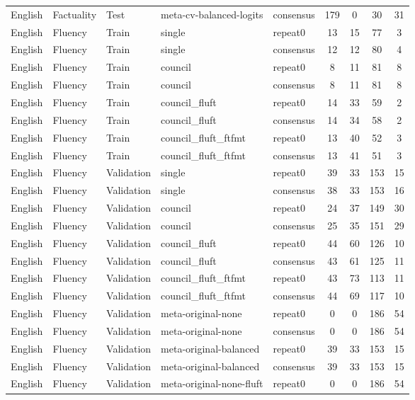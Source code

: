 \begin{tabular}{lllllcccc}
English & Factuality & Test & meta-cv-balanced-logits & consensus & 179 & 0 & 30 & 31 \\
English & Fluency & Train & single & repeat0 & 13 & 15 & 77 & 3 \\
English & Fluency & Train & single & consensus & 12 & 12 & 80 & 4 \\
English & Fluency & Train & council & repeat0 & 8 & 11 & 81 & 8 \\
English & Fluency & Train & council & consensus & 8 & 11 & 81 & 8 \\
English & Fluency & Train & council\_fluft & repeat0 & 14 & 33 & 59 & 2 \\
English & Fluency & Train & council\_fluft & consensus & 14 & 34 & 58 & 2 \\
English & Fluency & Train & council\_fluft\_ftfmt & repeat0 & 13 & 40 & 52 & 3 \\
English & Fluency & Train & council\_fluft\_ftfmt & consensus & 13 & 41 & 51 & 3 \\
English & Fluency & Validation & single & repeat0 & 39 & 33 & 153 & 15 \\
English & Fluency & Validation & single & consensus & 38 & 33 & 153 & 16 \\
English & Fluency & Validation & council & repeat0 & 24 & 37 & 149 & 30 \\
English & Fluency & Validation & council & consensus & 25 & 35 & 151 & 29 \\
English & Fluency & Validation & council\_fluft & repeat0 & 44 & 60 & 126 & 10 \\
English & Fluency & Validation & council\_fluft & consensus & 43 & 61 & 125 & 11 \\
English & Fluency & Validation & council\_fluft\_ftfmt & repeat0 & 43 & 73 & 113 & 11 \\
English & Fluency & Validation & council\_fluft\_ftfmt & consensus & 44 & 69 & 117 & 10 \\
English & Fluency & Validation & meta-original-none & repeat0 & 0 & 0 & 186 & 54 \\
English & Fluency & Validation & meta-original-none & consensus & 0 & 0 & 186 & 54 \\
English & Fluency & Validation & meta-original-balanced & repeat0 & 39 & 33 & 153 & 15 \\
English & Fluency & Validation & meta-original-balanced & consensus & 39 & 33 & 153 & 15 \\
English & Fluency & Validation & meta-original-none-fluft & repeat0 & 0 & 0 & 186 & 54 \\

\end{tabular}
